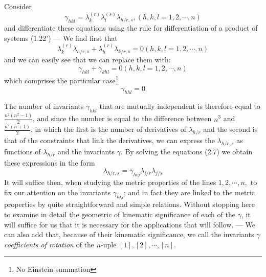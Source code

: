 \documentclass{book}
\begin{document}
Consider
\begin{equation}
\gamma_{hkl}=\lambda_k^{(r)}\lambda_l^{(s)}\lambda_{h/r,s}, (h,k,l=1,2,\cdots,n)
\end{equation}
and differentiate these equations using the rule for differentiation of a product of systems (1.22') --- We find first that
\begin{equation}
\lambda_k^{(r)}\lambda_{h/r,s}+\lambda^{(r)}_h\lambda_{k/r,s}=0 (h,k,l=1,2,\cdots,n)
\end{equation}
and we can easily see that we can replace them with:
\begin{equation*}
\tag{2.8'}
\gamma_{hkl}+\gamma_{khl}=0 (h,k,l=1,2,\cdots,n)
\end{equation*}
which comprises the particular case\footnote{No Einstein summation}
\begin{equation*}
\tag{$2.8_1$}
\gamma_{hhl}=0
\end{equation*}

The number of invariants $\gamma_{hkl}$ that are mutually independent is therefore equal to $\frac{n^2(n^2-1)}{2}$, and since the number is equal to the difference between $n^3$ and $\frac{n^2(n+1)}{2}$, in which the first is the number of derivatives of $\lambda_{h/r}$ and the second is that of the constraints that link the derivatives, we can express the $\lambda_{h/r,s}$ as functions of $\lambda_{h/r}$ and the invariants $\gamma$. By solving the equations (2.7) we obtain these expressions in the form
\begin{equation*}
\tag{2.7'}
\lambda_{h/r,s}=\gamma_{hij}\lambda_{i/r}\lambda_{j/s}
\end{equation*}
It will suffice then, when studying the metric properties of the lines $1,2,\cdots,n,$ to fix our attention on the invariants $\gamma_{hij}$; and in fact they are linked to the metric properties by quite straightforward and simple relations. Without stopping here to examine in detail the geometric of kinematic significance of each of the $\gamma$, it will suffice for us that it is necessary for the applications that will follow. --- We can also add that, because of their kinematic significance, we call the invariants $\gamma$ \emph{coefficients of rotation} of the $n$-uple $[1],[2],\cdots,[n]$.
\end{document}
